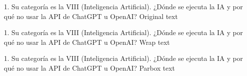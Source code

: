 \documentclass[10pt,letterpaper]{article}
\begin{document}
\begin{killerbox_orig}{1. Su categoría es la VIII (Inteligencia Artificial). ¿Dónde se ejecuta la IA y por qué no usar la API de ChatGPT u OpenAI?}
Original text
\end{killerbox_orig}

\begin{killerbox_wrap}{1. Su categoría es la VIII (Inteligencia Artificial). ¿Dónde se ejecuta la IA y por qué no usar la API de ChatGPT u OpenAI?}
Wrap text
\end{killerbox_wrap}

\begin{killerbox_parbox}{1. Su categoría es la VIII (Inteligencia Artificial). ¿Dónde se ejecuta la IA y por qué no usar la API de ChatGPT u OpenAI?}
Parbox text
\end{killerbox_parbox}
\end{document}
